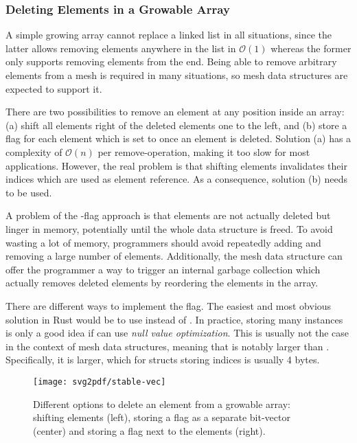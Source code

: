 \subsubsection*{Deleting Elements in a Growable Array}

A simple growing array cannot replace a linked list in all situations, since the latter allows removing elements anywhere in the list in $\mathcal O(1)$ whereas the former only supports removing elements from the end.
Being able to remove arbitrary elements from a mesh is required in many situations, so mesh data structures are expected to support it.

There are two possibilities to remove an element at any position inside an array: (a) shift all elements right of the deleted elements one to the left, and (b) store a  flag for each element which is set to  once an element is deleted.
Solution (a) has a complexity of $\mathcal O(n)$ per remove-operation, making it too slow for most applications.
However, the real problem is that shifting elements invalidates their indices which are used as element reference.
As a consequence, solution (b) needs to be used.

\newpage
A problem of the -flag approach is that elements are not actually deleted but linger in memory, potentially until the whole data structure is freed.
To avoid wasting a lot of memory, programmers should avoid repeatedly adding and removing a large number of elements.
Additionally, the mesh data structure can offer the programmer a way to trigger an internal garbage collection which actually removes deleted elements by reordering the elements in the array.

There are different ways to implement the  flag.
The easiest and most obvious solution in Rust would be to use  instead of .
In practice, storing many  instances is only a good idea if  can use \emph{null value optimization}.
This is usually not the case in the context of mesh data structures, meaning that  is notably larger than .
Specifically, it is  larger, which for structs storing  indices is usually 4 bytes.

\begin{figure}[t]
  \centering
  \texttt{[image: svg2pdf/stable-vec]}
  \caption{Different options to delete an element from a growable array: shifting elements (left), storing a  flag as a separate bit-vector (center) and storing a  flag next to the elements (right).}
  \vspace{5mm}
\end{figure}

